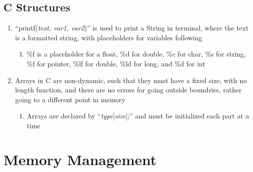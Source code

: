 \documentclass[11 pt, twoside]{article}
\begin{document}
\subsection{C Structures}
\begin{enumerate}
\item ``printf(\textit{text, var1, var2})'' is used to print a String in terminal, where the text is a formatted string, with placeholders for variables following
\begin{enumerate}
\item \%f is a placeholder for a float, \%d for double, \%c for char, \%s for string, \%f for pointer, \%lf for double, \%ld for long, and \%d for int
\end{enumerate}
\item Arrays in C are non-dynamic, such that they must have a fixed size, with no length function, and there are no errors for going outside boundries, rather going to a different point in memory
\begin{enumerate}
\item Arrays are declared by ``\textit{type}[\textit{size}];'' and must be initialized each part at a time
\end{enumerate}
\end{enumerate}

\section{Memory Management}
\end{document}
